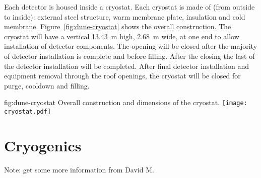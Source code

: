 Each detector is housed inside a cryostat. Each cryostat is made of
(from outside to inside): external steel structure, warm membrane
plate, insulation and cold membrane. Figure~\ref{fig:dune-cryostat}
shows the overall construction. The cryostat will have a vertical
 \SI{13.43}{\meter} high, \SI{2.68}{\meter}
wide, at one end to allow installation of detector components. The
opening will be closed after the majority of detector installation is
complete and before filling. After the  closing the last of the
detector installation will be completed. After final detector
installation and equipment removal through the roof openings, the
cryostat will be closed for purge, cooldown and filling.
\begin{dunefigure}{fig:dune-cryostat}
  {Overall construction and dimensions of the  cryostat.}
  \texttt{[image: cryostat.pdf]}
\end{dunefigure}

\section{Cryogenics}
\label{sec:fdsp-coord-cryogenics}

Note: get some more information from David M.


